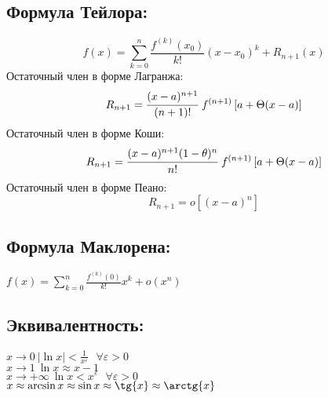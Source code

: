 \documentclass[12pt, a6paper]{extarticle}
\begin{document}
\subsection{Формула Тейлора:}
$$ \displaystyle f(x)=\sum\limits_{k=0}^n{\displaystyle\frac{f^{(k)}(x_0)}{k!}(x-x_0)^k+R_{n+1}(x)} $$
Остаточный член в форме Лагранжа:
$$ R_{n+1} = \cfrac{(x-a)^{n+1}}{(n+1)!}\ f^{(n+1)} \left[a + \Theta(x-a)\right] $$
Остаточный член в форме Коши:
$$ R_{n+1} = \cfrac{(x-a)^{n+1}(1-\theta)^n}{n!}\ f^{(n+1)} \left[a + \Theta(x-a)\right] $$
Остаточный член в форме Пеано:
$$ R_{n+1} = o\left[(x-a)^n\right] $$
\subsection{Формула Маклорена:}
$ \displaystyle f(x)=\sum\limits_{k=0}^n{\displaystyle\frac{f^{(k)}(0)}{k!}x^k+o(x^n)} $ \newline
\subsection{Эквивалентность:}
  $x\rightarrow 0 \ |\ln x|< \displaystyle \frac{1}{x^\varepsilon } \ \ \ \forall \varepsilon>0$ \\
  $x\rightarrow 1 \ \ln x\approx x-1 $ \\
  $x\rightarrow +\infty \ \ln x< x^\varepsilon \ \ \ \forall \varepsilon>0$ \\
  $x \approx \arcsin{x}\approx \sin{x}\approx \tg{x} \approx \arctg{x} $ \\
\newpage
\par
\end{document}
